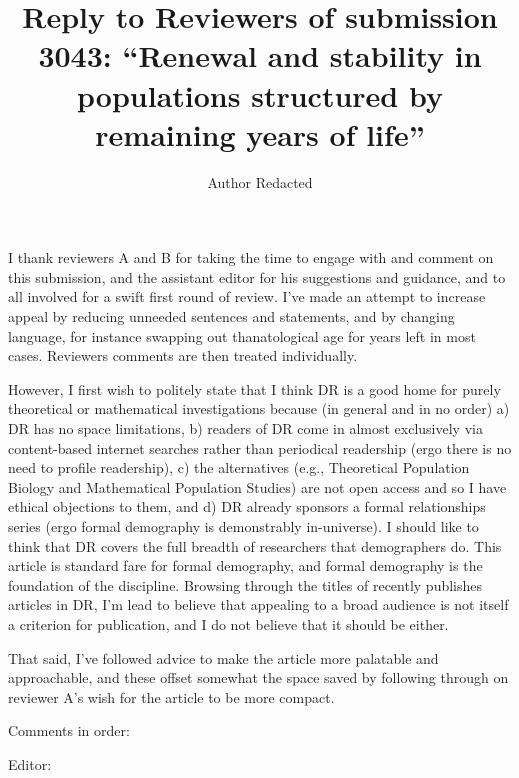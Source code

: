 \documentclass{article}
\begin{document}
\title{Reply to Reviewers of submission 3043: ``Renewal and stability in populations structured by remaining years of
life''}
\author{Author Redacted}
\maketitle

I thank reviewers A and B for taking the time to engage with and comment on this
submission, and the assistant editor for his suggestions and guidance, and to
all involved for a swift first round of review. I've made an attempt to increase
appeal by reducing unneeded sentences and statements, and by changing
language, for instance swapping out thanatological age for years left in most
cases. Reviewers comments are then treated individually.

However, I first wish to politely state that I think DR is a good home for
purely theoretical or mathematical investigations because (in general and in no
order) a) DR has no space limitations, b) readers of DR come in almost
exclusively via content-based internet searches rather than periodical
readership (ergo there is no need to profile readership), c) the alternatives
(e.g., Theoretical Population Biology and Mathematical Population Studies) are not open access and so I have ethical objections to
them, and d) DR already sponsors a formal relationships series (ergo formal demography is demonstrably in-universe). I
should like to think that DR covers the full breadth of researchers that
demographers do. This article is standard fare for formal demography, and formal
demography is the foundation of the discipline. Browsing through the titles of
recently publishes articles in DR, I'm lead to believe that appealing to a broad
audience is not itself a criterion for publication, and I do not believe that it
should be either.

That said, I've followed advice to make the article more palatable and
approachable, and these offset somewhat the space saved by following through on
reviewer A's wish for the article to be more compact.

Comments in order:

Editor:
\end{document}
